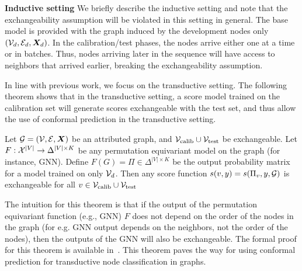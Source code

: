 \noindent \textbf{Inductive setting}
We briefly describe the inductive setting and note that the exchangeability assumption will be violated in this setting in general.
The base model is provided with the graph induced by the development nodes only $({\mathcal{V}}_d, {\mathcal{E}}_d, {\bm{X}}_d)$.
In the calibration/test phases, the nodes arrive either one at a time or in batches.
Thus, nodes arriving later in the sequence will have access to neighbors that arrived earlier, breaking the exchangeability assumption.

In line with previous work, we focus on the transductive setting.
The following theorem shows that in the transductive setting, a score model trained on the calibration set will generate scores exchangeable with the test set, and thus allow the use of conformal prediction in the transductive setting.

\begin{theorem}
    Let ${\mathcal{G}} = ({\mathcal{V}}, {\mathcal{E}}, {\bm{X}})$ be an attributed graph, and ${\mathcal{V}}_{\text{calib}} \cup {\mathcal{V}}_{\text{test}}$ be exchangeable.
    Let $F: {\mathcal{X}}^{|V|} \rightarrow \Delta^{|V| \times K}$ be any permutation equivariant model on the graph (for instance, GNN). 
    Define $F(G) = \Pi \in \Delta^{|V| \times K}$ be the output probability matrix for a model trained on only ${\mathcal{V}}_d$.
    Then any score function $s(v, y) = s(\Pi_v, y, {\mathcal{G}})$ is exchangeable for all $v \in {\mathcal{V}}_{\text{calib}} \cup{\mathcal{V}}_{\text{test}} $
    \label{thm:exchangeability}
\end{theorem}
The intuition for this theorem is that if the output of the permutation equivariant function (e.g., GNN) $F$ does not depend on the order of the nodes in the graph (for e.g. GNN output depends on the neighbors, not the order of the nodes), then the outputs of the GNN will also be exchangeable.
The formal proof for this theorem is available in~\citet{zargarbashi23conformal,huang2024uncertainty}.
This theorem paves the way for using conformal prediction for transductive node classification in graphs.


